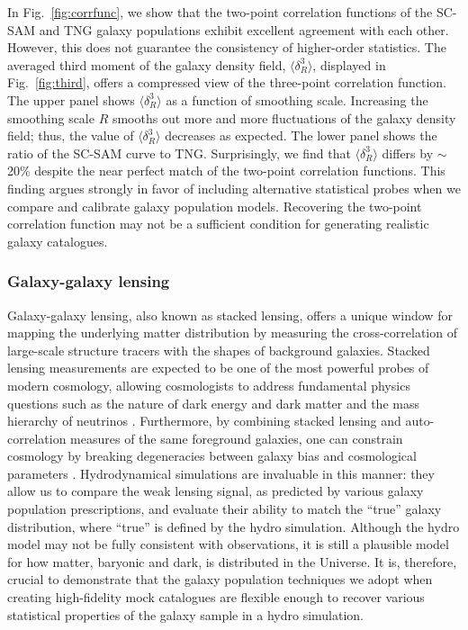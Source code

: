 \documentclass[fleqn,usenatbib]{mnras}
\begin{document}
In Fig.~\ref{fig:corrfunc}, we show that the two-point correlation functions of the SC-SAM and TNG galaxy populations exhibit excellent agreement with each other. However, this does not guarantee the consistency of higher-order statistics. The averaged third moment of the galaxy density field, $\langle \delta^3_R \rangle$, displayed in Fig.~\ref{fig:third}, offers a compressed view of the three-point correlation function. The upper panel shows  $\langle \delta^3_R \rangle$ as a function of smoothing scale. Increasing the smoothing scale $R$ smooths out more and more fluctuations of the galaxy density field; thus, the value of $\langle \delta^3_R \rangle$ decreases as expected. The lower panel shows the ratio of the SC-SAM curve to TNG. Surprisingly, we find that  $\langle \delta^3_R \rangle$ differs by $\sim$20\% despite the near perfect match of the two-point correlation functions. This finding argues strongly in favor of including alternative statistical probes when we compare and calibrate galaxy population models. Recovering the two-point correlation function may not be a sufficient condition for generating realistic galaxy catalogues.

\subsubsection{Galaxy-galaxy lensing}

Galaxy-galaxy lensing, also known as stacked lensing, offers a unique window for mapping the underlying matter distribution by measuring the cross-correlation of large-scale structure tracers with the shapes of background galaxies. Stacked lensing measurements are expected to be one of the most powerful probes of modern cosmology, allowing cosmologists to address fundamental physics questions such as the nature of dark energy and dark matter and the mass hierarchy of neutrinos \citep[e.g.][]{2011PhRvD..83b3008O}. Furthermore, by combining stacked lensing and auto-correlation measures of the same foreground galaxies, one can constrain cosmology by breaking degeneracies between galaxy bias and cosmological parameters \citep[e.g.][]{2005PhRvD..71d3511S,2020arXiv200203867S}. Hydrodynamical simulations are invaluable in this manner: they allow us to compare the weak lensing signal, as predicted by various galaxy population prescriptions, and evaluate their ability to match the ``true'' galaxy distribution, where ``true'' is defined by the hydro simulation. Although the hydro model may not be fully consistent with observations, it is still a plausible model for how matter, baryonic and dark, is distributed in the Universe. It is, therefore, crucial to demonstrate that the galaxy population techniques we adopt when creating high-fidelity mock catalogues are flexible enough to recover various statistical properties of the galaxy sample in a hydro simulation.
\end{document}
